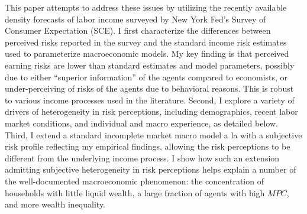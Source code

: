 
This paper attempts to address these issues by utilizing the recently available density forecasts of labor income surveyed by New York Fed's Survey of Consumer Expectation (SCE). I first characterize the differences between perceived risks reported in the survey and the standard income risk estimates used to parameterize macroeconomic models. My key finding is that perceived earning risks are lower than standard estimates and model parameters, possibly due to either ``superior information'' of the agents compared to economists, or under-perceiving of risks of the agents due to behavioral reasons. This is robust to various income processes used in the literature. Second, I explore a variety of drivers of heterogeneity in risk perceptions, including demographics, recent labor market conditions, and individual and macro experience, as detailed below. Third, I extend a standard incomplete market macro model a la \cite{huggett1993risk} with a subjective risk profile reflecting my empirical findings, allowing the risk perceptions to be different from the underlying income process. I show how such an extension admitting subjective heterogeneity in risk perceptions helps explain a number of the well-documented macroeconomic phenomenon: the concentration of households with little liquid wealth, a large fraction of agents with high $MPC$, and more wealth inequality. 



